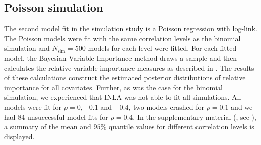 
\subsection{Poisson simulation}
The second model fit in the simulation study is a Poisson regression with log-link. The Poisson models were fit with the same correlation levels as the binomial simulation and $N_{\text{sim}}=500$ models for each level were fitted. For each fitted model, the Bayesian Variable Importance method draws a sample and then calculates the relative variable importance measures as described in . The results of these calculations construct the estimated posterior distributions of relative importance for all covariates. Further, as was the case for the binomial simulation, we experienced that INLA was not able to fit all simulations. All models were fit for $\rho=0, -0.1$ and $-0.4$, two models crashed for $\rho=0.1$ and we had $84$ unsuccessful model fits for $\rho=0.4$. In the supplementary material (, see ), a summary of the mean and $95\%$ quantile values for different correlation levels is displayed.
